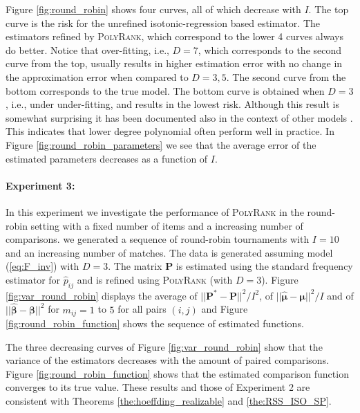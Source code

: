 \documentclass[twoside,11pt]{article}
\begin{document}
Figure \ref{fig:round_robin} shows four curves, all of which decrease with $I$. The top curve is the risk for the unrefined isotonic-regression based estimator. The estimators refined by \textsc{PolyRank}, which correspond to the lower 4 curves always do better. Notice that over-fitting, i.e., $D=7$, which corresponds to the second curve from the top, usually results in higher estimation error with no change in the approximation error when compared to $D=3,5$. The second curve from the bottom corresponds to the true model. The bottom curve is obtained when $D=3$, i.e., under under-fitting, and results in the lowest risk. Although this result is somewhat surprising it has been documented also in the context of other models \citep[Chapter 5]{claeskens}. This indicates that lower degree polynomial often perform well in practice. In Figure \ref{fig:round_robin_parameters} we see that the average error of the estimated parameters decreases as a function of $I$.


\paragraph{Experiment 3:} In this experiment we investigate the performance of  \textsc{PolyRank} in the round-robin setting with a fixed number of items and a increasing number of comparisons. we generated a sequence of round-robin tournaments with $I=10$ and an increasing number of matches. The data is generated assuming model (\ref{eq:F_inv}) with $D=3$. The matrix $\boldsymbol{P}$ is estimated using the standard frequency estimator for $\hat{p}_{ij} $   and is refined using  \textsc{PolyRank} (with $D=3$). Figure \ref{fig:var_round_robin} displays the average of $||\boldsymbol{P}^* - \boldsymbol{P}||^2/I^2$, of $||\boldsymbol{\hat \mu} - \boldsymbol{\mu}||^2/I$ and of $||\boldsymbol{\hat \beta} - \boldsymbol{\beta}||^2$ for $m_{ij}  = 1$ to $5$ for all pairs $(i,j)$ and Figure \ref{fig:round_robin_function} shows the sequence of estimated functions.

The three decreasing curves of Figure \ref{fig:var_round_robin} show that the variance of the estimators decreases with the amount of paired comparisons. Figure \ref{fig:round_robin_function} shows that the estimated comparison function converges to its true value. These results and those of Experiment 2 are consistent with Theorems \ref{the:hoeffding_realizable} and \ref{the:RSS_ISO_SP}.
\end{document}
